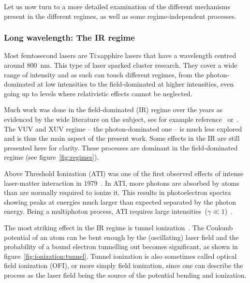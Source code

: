 Let us now turn to a more detailed examination of the different mechanisms
present in the different regimes, as well as some regime-independent processes.



\subsubsection{Long wavelength: The IR regime}
\label{section:intro:mechanisms:ir}

Most femtosecond lasers are Ti:sapphire lasers that have a wavelength centred around 800~nm.
This type of laser sparked cluster research. They cover a wide range of
intensity and as such can touch different regimes, from the photon-dominated
at low intensities to the field-dominated at higher intensities,
even going up to levels where relativistic effects cannot be neglected.

Much work was done in the field-dominated (IR) regime over the
years as evidenced by the wide literature on the subject, see for example
reference~\cite{Fennel2010} or~\cite{Ramunno2008}. The VUV and XUV regime
-- the photon-dominated one -- is much less explored and is thus the main
aspect of the present work. Some effects in the IR are still presented here
for clarity. These processes are dominant in the field-dominated regime (see
figure~\ref{fig:regimes}).



Above Threshold Ionization (ATI) was one of the first observed effects of
intense laser-matter interaction in 1979~\cite{Agostini1979}.
In ATI, more photons are absorbed by atoms
than are normally required to ionize it. This results in photoelectron spectra
showing peaks at energies much larger than expected separated by the photon
energy. Being a multiphoton process, ATI requires large
intensities~($\gamma \ll 1$)~\cite{Krainov1997,Lewenstein2008}.



The most striking effect in the IR regime is tunnel ionization~\cite{Niikura2009}.
The Coulomb potential of an atom can be bent enough by the (oscillating) laser
field and the probability of a bound electron tunnelling out becomes significant,
as shown in figure~\ref{fig:ionization:tunnel}. Tunnel ionization is also
sometimes called optical field ionization (OFI), or more simply field
ionization, since one can describe the process as the laser field being the source
of the potential bending and ionization.


